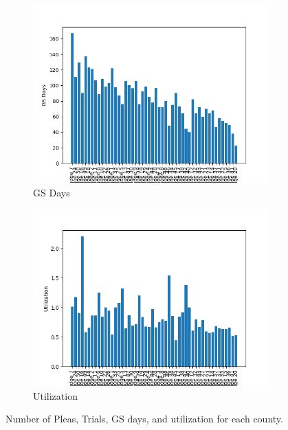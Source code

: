 \documentclass[11pt]{article}
\begin{document}
\begin{figure}[H]
\begin{subfigure}[b]{0.45\textwidth}
          \includegraphics[width=\textwidth]{../../../output/figures/Exploration/judge_days.png}
          \caption{GS Days}

        \end{subfigure}
        \hfill
        \begin{subfigure}[b]{0.45\textwidth}

          \includegraphics[width=\textwidth]{../../../output/figures/Exploration/judge_utilization.png}
          \caption{Utilization}

        \end{subfigure}
        \caption{Number of Pleas, Trials, GS days, and utilization for each county.}
        \label{fig-county}
    \end{figure}
\end{document}

